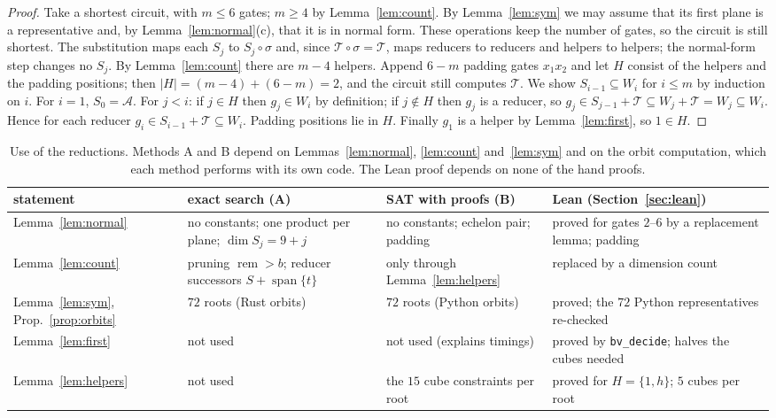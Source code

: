 \documentclass[11pt,a4paper]{article}
\theoremstyle{definition}
\newcommand{\Aff}{\mathcal{A}}
\newcommand{\Tg}{\mathcal{T}}
\newcommand{\rem}{\operatorname{rem}}
\newcommand{\spn}{\operatorname{span}}
\newcommand{\code}[1]{\texttt{#1}}
\begin{document}
\begin{proof}
Take a shortest circuit, with $m\le 6$ gates; $m\ge4$ by Lemma~\ref{lem:count}. By Lemma~\ref{lem:sym} we may assume that its first plane is a representative and, by Lemma~\ref{lem:normal}(c), that it is in normal form. These operations keep the number of gates, so the circuit is still shortest. The substitution maps each $S_j$ to $S_j\circ\sigma$ and, since $\Tg\circ\sigma=\Tg$, maps reducers to reducers and helpers to helpers; the normal-form step changes no $S_j$. By Lemma~\ref{lem:count} there are $m-4$ helpers. Append $6-m$ padding gates $x_1x_2$ and let $H$ consist of the helpers and the padding positions; then $|H|=(m-4)+(6-m)=2$, and the circuit still computes $\Tg$. We show $S_{i-1}\subseteq W_i$ for $i\le m$ by induction on $i$. For $i=1$, $S_0=\Aff$. For $j<i$: if $j\in H$ then $g_j\in W_i$ by definition; if $j\notin H$ then $g_j$ is a reducer, so $g_j\in S_{j-1}+\Tg\subseteq W_j+\Tg=W_j\subseteq W_i$. Hence for each reducer $g_i\in S_{i-1}+\Tg\subseteq W_i$. Padding positions lie in $H$. Finally $g_1$ is a helper by Lemma~\ref{lem:first}, so $1\in H$.
\end{proof}

\begin{table}[ht]
\centering
\footnotesize
\begin{tabular}{>{\raggedright}p{}>{\raggedright}p{}>{\raggedright}p{}>{\raggedright\arraybackslash}p{}}
\toprule
statement & exact search (A) & SAT with proofs (B) & Lean (Section~\ref{sec:lean})\\
\midrule
Lemma~\ref{lem:normal} & no constants; one product per plane; $\dim S_j=9+j$ & no constants; echelon pair; padding & proved for gates $2$--$6$ by a replacement lemma; padding\\
Lemma~\ref{lem:count} & pruning $\rem>b$; reducer successors $S+\spn\{t\}$ & only through Lemma~\ref{lem:helpers} & replaced by a dimension count\\
Lemma~\ref{lem:sym}, Prop.~\ref{prop:orbits} & $72$ roots (Rust orbits) & $72$ roots (Python orbits) & proved; the $72$ Python representatives re-checked\\
Lemma~\ref{lem:first} & not used & not used (explains timings) & proved by \code{bv\_decide}; halves the cubes needed\\
Lemma~\ref{lem:helpers} & not used & the $15$ cube constraints per root & proved for $H=\{1,h\}$; $5$ cubes per root\\
\bottomrule
\end{tabular}
\caption{Use of the reductions. Methods A and B depend on Lemmas~\ref{lem:normal}, \ref{lem:count} and~\ref{lem:sym} and on the orbit computation, which each method performs with its own code. The Lean proof depends on none of the hand proofs.}
\label{tab:use}
\end{table}
\end{document}
